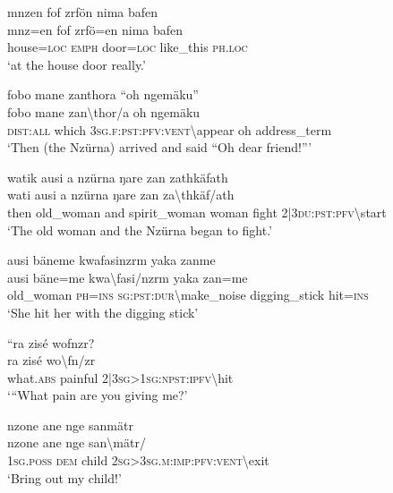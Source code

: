 \ea\label{ex:8:a1777}
mnzen fof zrfön nima bafen\\
\gll mnz=en	fof	zrfö=en	nima	bafen\\
     house=\textsc{loc}	\textsc{emph}	door=\textsc{loc}	like\_this	\textsc{ph}.\textsc{loc}\\
\glt `at the house door really.'
\z

\ea\label{ex:8:a1778}
fobo mane zanthora ``oh ngemäku''\\
\gll fobo	mane	zan{\textbackslash}thor/a	oh	ngemäku\\
     \textsc{dist}:\textsc{all}	which	3\textsc{sg}.\textsc{f}:\textsc{pst}:\textsc{pfv}:\textsc{vent}{\textbackslash}appear	oh	address\_term\\
\glt `Then (the Nzürna) arrived and said ``Oh dear friend!'''
\z

\ea\label{ex:8:a1780}
watik ausi a nzürna ŋare zan zathkäfath\\
\gll wati	ausi	a	nzürna	ŋare	zan	za{\textbackslash}thkäf/ath\\
     then	old\_woman	and	spirit\_woman	woman	fight	2|3\textsc{du}:\textsc{pst}:\textsc{pfv}{\textbackslash}start\\
\glt `The old woman and the Nzürna began to fight.'
\z

\ea\label{ex:8:a1782}
ausi bäneme kwafasinzrm yaka zanme\\
\gll ausi	bäne=me	kwa{\textbackslash}fasi/nzrm	yaka	zan=me\\
     old\_woman	\textsc{ph}=\textsc{ins}	\textsc{sg}:\textsc{pst}:\textsc{dur}{\textbackslash}make\_noise	digging\_stick	hit=\textsc{ins}\\
\glt `She hit her with the digging stick'
\z

\ea\label{ex:8:a1783}
``ra zisé wofnzr?\\
\gll ra	zisé	wo{\textbackslash}fn/zr\\
     what.\textsc{abs}	painful	2|3\textsc{sg}>1\textsc{sg}:\textsc{npst}:\textsc{ipfv}{\textbackslash}hit\\
\glt `{``}What pain are you giving me?'
\z

\ea\label{ex:8:a1784}
nzone ane nge sanmätr\\
\gll nzone	ane	nge	san{\textbackslash}mätr/\\
     1\textsc{sg}.\textsc{poss}	\textsc{dem}	child	2\textsc{sg}>3\textsc{sg}.\textsc{m}:\textsc{imp}:\textsc{pfv}:\textsc{vent}{\textbackslash}exit\\
\glt `Bring out my child!'
\z

